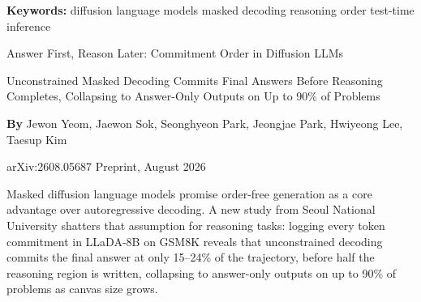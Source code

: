 \documentclass[10pt,twocolumn]{article}
\begin{document}
\setlength{\parindent}{0pt}
\setlength{\parskip}{4pt}

{\small\color{keywordgray}\textbf{Keywords:}
  diffusion language models \textbullet{}
  masked decoding \textbullet{}
  reasoning order \textbullet{}
  test-time inference}\par\vspace{4pt}

{\LARGE\bfseries\raggedright
  Answer First, Reason Later:
  Commitment Order in Diffusion LLMs}\par\vspace{4pt}

{\large\itshape\raggedright
  Unconstrained Masked Decoding Commits Final Answers Before Reasoning Completes,
  Collapsing to Answer-Only Outputs on Up to 90\% of Problems}\par\vspace{6pt}

{\small\textbf{By} Jewon Yeom, Jaewon Sok, Seonghyeon Park, Jeongjae Park,
  Hwiyeong Lee, Taesup Kim}\par\vspace{2pt}

{\small\color{keywordgray}arXiv:2608.05687 \textbullet{} Preprint, August 2026}
\par\vspace{2pt}\noindent{\color{rulered}\rule{\columnwidth}{0.6pt}}\vspace{6pt}

Masked diffusion language models promise order-free generation as a core
advantage over autoregressive decoding. A new study from Seoul National University
shatters that assumption for reasoning tasks: logging every token commitment in
LLaDA-8B on GSM8K reveals that unconstrained decoding commits the final answer
at only 15--24\% of the trajectory, before half the reasoning region is written,
collapsing to answer-only outputs on up to 90\% of problems as canvas size grows.
\end{document}
